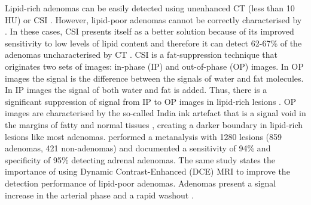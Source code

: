 \documentclass{article}
\begin{document}
Lipid-rich adenomas can be easily detected using unenhanced CT (less than 10 HU)
\cite{Panda2015} or CSI \cite{Platzek2019}. However, lipid-poor adenomas cannot
be correctly characterised by  \cite{Israel2004}. In these cases,
CSI presents itself as a better solution because of its improved sensitivity to
low levels of lipid content and therefore it can detect 62-67\% of the adenomas
uncharacterised by CT \cite{Israel2004}. CSI is a fat-suppression technique that
originates two sets of images: in-phase (IP) and out-of-phase (OP) images. In OP
images the signal is the difference between the signals of water and fat
molecules. In IP images the signal of both water and fat is added. Thus, there
is a significant suppression of signal from IP to OP images in lipid-rich
lesions \cite{Jahanvi2021}. OP images are characterised by the so-called India
ink artefact that is a signal void in the margins of fatty and normal tissues
\cite{Jahanvi2021}, creating a darker boundary in lipid-rich lesions like most
adenomas. \cite{Platzek2019} performed a metanalysis with 1280 lesions (859
adenomas, 421 non-adenomas) and documented a sensitivity of 94\% and specificity
of 95\% detecting adrenal adenomas. The same study states the importance of
using Dynamic Contrast-Enhanced (DCE) MRI to improve the detection performance
of lipid-poor adenomas. Adenomas present a signal increase in the arterial phase
and a rapid washout \cite{Chung2001}.
\end{document}
